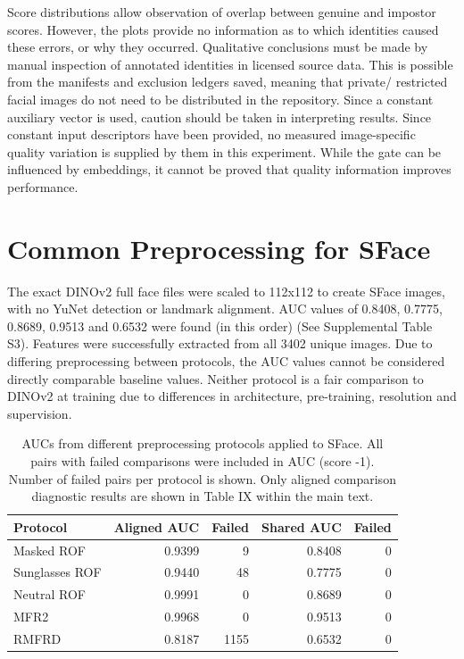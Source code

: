 \documentclass[10pt,lettersize,journal]{IEEEtran}
\begin{document}
Score distributions allow observation of overlap between genuine and impostor scores. However, the plots provide no information as to which identities caused these errors, or why they occurred. Qualitative conclusions must be made by manual inspection of annotated identities in licensed source data. This is possible from the manifests and exclusion ledgers saved, meaning that private/ restricted facial images do not need to be distributed in the repository. Since a constant auxiliary vector is used, caution should be taken in interpreting results. Since constant input descriptors have been provided, no measured image-specific quality variation is supplied by them in this experiment. While the gate can be influenced by embeddings, it cannot be proved that quality information improves performance.\par

\section{Common Preprocessing for SFace}

The exact DINOv2 full face files were scaled to 112x112 to create SFace images, with no YuNet detection or landmark alignment. AUC values of 0.8408, 0.7775, 0.8689, 0.9513 and 0.6532 were found (in this order) (See Supplemental Table S3). Features were successfully extracted from all 3402 unique images. Due to differing preprocessing between protocols, the AUC values cannot be considered directly comparable baseline values. Neither protocol is a fair comparison to DINOv2 at training due to differences in architecture, pre-training, resolution and supervision.\par

\begin{table}[!ht]\centering\footnotesize\setlength{\tabcolsep}{2pt}
\caption{AUCs from different preprocessing protocols applied to SFace. All pairs with failed comparisons were included in AUC (score -1). Number of failed pairs per protocol is shown. Only aligned comparison diagnostic results are shown in Table IX within the main text.}
\label{tab:sfaceshared}\begin{tabular}{lrrrr}\toprule
Protocol & Aligned AUC & Failed & Shared AUC & Failed\\\midrule
Masked ROF & 0.9399 & 9 & 0.8408 & 0\\
Sunglasses ROF & 0.9440 & 48 & 0.7775 & 0\\
Neutral ROF & 0.9991 & 0 & 0.8689 & 0\\
MFR2 & 0.9968 & 0 & 0.9513 & 0\\
RMFRD & 0.8187 & 1155 & 0.6532 & 0\\
\bottomrule\end{tabular}\end{table}
\end{document}
